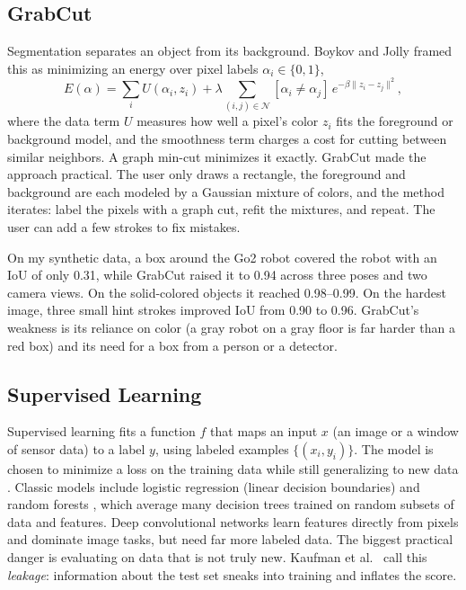 \documentclass[11pt]{article}
\begin{document}
\subsection{GrabCut}
Segmentation separates an object from its background. Boykov and Jolly \cite{boykov} framed this as minimizing an energy
over pixel labels $\alpha_i \in \{0,1\}$,
\begin{equation}
E(\alpha) = \sum_i U(\alpha_i, z_i) + \lambda \sum_{(i,j) \in \mathcal{N}} [\alpha_i \neq \alpha_j]\, e^{-\beta \|z_i - z_j\|^2},
\end{equation}
where the data term $U$ measures how well a pixel's color $z_i$ fits the foreground or background model, and the
smoothness term charges a cost for cutting between similar neighbors. A graph min-cut minimizes it exactly. GrabCut \cite{grabcut} made the approach practical. The user only draws a rectangle, the foreground and
background are each modeled by a Gaussian mixture of colors, and the method iterates: label the pixels with a graph cut,
refit the mixtures, and repeat. The user can add a few strokes to fix mistakes.

On my synthetic data, a box around the Go2 robot covered the robot with an IoU of only 0.31, while GrabCut raised it to
0.94 across three poses and two camera views. On the solid-colored objects it reached 0.98--0.99. On the hardest image,
three small hint strokes improved IoU from 0.90 to 0.96. GrabCut's weakness is its reliance on color (a gray robot on a gray floor is far
harder than a red box) and its need for a box from a person or a detector.

\subsection{Supervised Learning}
Supervised learning fits a function $f$ that maps an input $x$ (an image or a window of sensor data) to a label $y$, using
labeled examples $\{(x_i, y_i)\}$. The model is chosen to minimize a loss on the training data while still generalizing to new
data \cite{hastie}. Classic models include logistic regression (linear decision boundaries) and random forests \cite{breiman}, which
average many decision trees trained on random subsets of data and features. Deep convolutional networks \cite{lecun} learn
features directly from pixels and dominate image tasks, but need far more labeled data. The biggest practical danger is evaluating on data that is not truly new. Kaufman et al.\ \cite{leakage} call
this \emph{leakage}: information about the test set sneaks into training and inflates the score.
\end{document}
